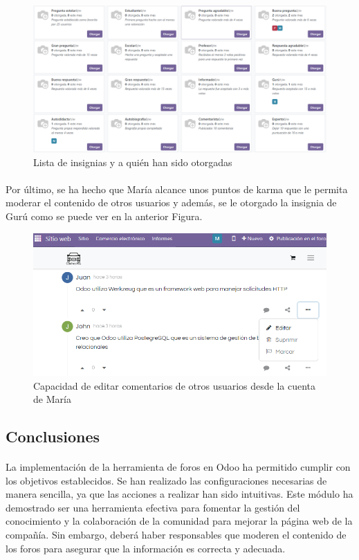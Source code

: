 \begin{figure}[h]
    \centering
    \includegraphics[width=1\linewidth]{fotosGestCon/insignias.png}
    \caption{Lista de insignias y a quién han sido otorgadas}
    \label{fig:enter-label}
\end{figure}
\paragraph{}
Por último, se ha hecho que María alcance unos puntos de karma que le permita moderar el contenido de otros usuarios y además, se le otorgado la insignia de Gurú como se puede ver en la anterior Figura.
\newpage
\begin{figure}[h]
    \centering
    \includegraphics[width=1\linewidth]{fotosGestCon/privilegio.png}
    \caption{Capacidad de editar comentarios de otros usuarios desde la cuenta de María}
    \label{fig:enter-label}
\end{figure}
\subsection{Conclusiones}
\paragraph{}
La implementación de la herramienta de foros en Odoo ha permitido cumplir con los objetivos establecidos. Se han realizado las configuraciones necesarias de manera sencilla, ya que las acciones a realizar han sido intuitivas. 
Este módulo ha demostrado ser una herramienta efectiva para fomentar la gestión del conocimiento y la colaboración de la comunidad para mejorar la página web de la compañía. Sin embargo, deberá haber responsables que moderen el contenido de los foros para asegurar que la información es correcta y adecuada.